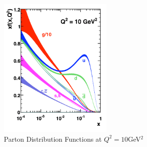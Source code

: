 \begin{figure}
    \centering
    \includegraphics[width=0.5\textwidth]{Figures/The-parton-distribution-function-PDF-describes-the-probability-density-of-finding.png}
    \caption{Parton Distribution Functions at $Q^2=10$GeV$^2$\cite{Martin_2009}}
    \label{fig:PDFs}
\end{figure}